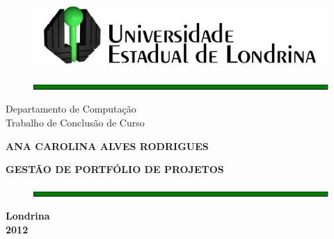 
\thispagestyle{empty}

\begin{titlepage}
 \vfill
 \begin{center}

	\begin{figure}[htb]
		\centering \includegraphics[scale=1]{preTextuais/img/uel.png}
	\end{figure}

	\begin{figure}[htb]
		\centering \includegraphics[scale=.67]{preTextuais/img/barra_capa.png}
	\end{figure}
	
	
	{\large Departamento de Computa\c{c}\~ao \\
	Trabalho de Conclus\~ao de Curso}

	{\large \textbf{ANA CAROLINA ALVES RODRIGUES}}

	{\Large \textbf{GEST\~AO DE PORTF\'OLIO DE PROJETOS}}


	\begin{figure}[htb]
		\centering \includegraphics[scale=.67]{preTextuais/img/barra_capa.png}
	\end{figure}
	\vfill
	{\bf Londrina \\
 	2012}
	\end{center}
\end{titlepage}

